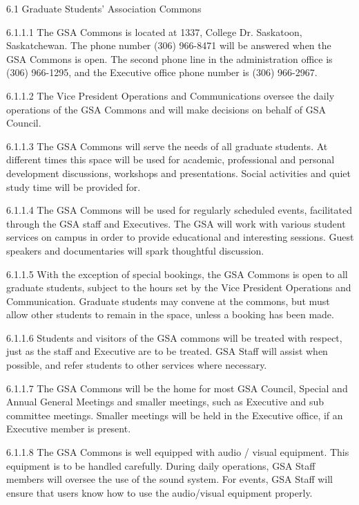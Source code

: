 ﻿6.1 Graduate Students’ Association Commons 
 
 
 
 6.1.1.1 The GSA Commons is located at 1337, College Dr. Saskatoon, 
 Saskatchewan. The phone number (306) 966-8471 will be answered 
 when the GSA Commons is open. The second phone line in the 
 administration office is (306) 966-1295, and the Executive office 
 phone number is (306) 966-2967. 
 
 6.1.1.2 The Vice President Operations and Communications oversee the 
 daily operations of the GSA Commons and will make decisions on 
 behalf of GSA Council. 
 
 6.1.1.3 The GSA Commons will serve the needs of all graduate students. At 
 different times this space will be used for academic, professional 
 and personal development discussions, workshops and 
 presentations. Social activities and quiet study time will be provided 
 for. 
 
 6.1.1.4 The GSA Commons will be used for regularly scheduled events, 
 facilitated through the GSA staff and Executives. The GSA will 
 work with various student services on campus in order to provide 
 educational and interesting sessions. Guest speakers and 
 documentaries will spark thoughtful discussion. 
 
 6.1.1.5 With the exception of special bookings, the GSA Commons is open 
 to all graduate students, subject to the hours set by the Vice 
 President Operations and Communication. Graduate students may 
 convene at the commons, but must allow other students to remain in 
 the space, unless a booking has been made. 
 
 6.1.1.6 Students and visitors of the GSA commons will be treated with 
 respect, just as the staff and Executive are to be treated. GSA Staff 
 will assist when possible, and refer students to other services where 
 necessary. 
 
 6.1.1.7 The GSA Commons will be the home for most GSA Council, 
 Special and Annual General Meetings and smaller meetings, such as 
 Executive and sub committee meetings. Smaller meetings will be 
 held in the Executive office, if an Executive member is present. 
 
 6.1.1.8 The GSA Commons is well equipped with audio / visual equipment. 
 This equipment is to be handled carefully. During daily operations, 
 GSA Staff members will oversee the use of the sound system. For 
 events, GSA Staff will ensure that users know how to use the 
 audio/visual equipment properly. 
 
